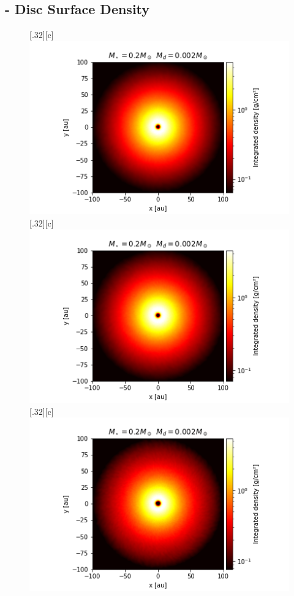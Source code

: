 \documentclass[aps,prb,twocolumn,superscriptaddress,floatfix,longbibliography]{revtex4-2}
\begin{document}
\begin{appendices}
\section{- Disc Surface Density}\label{app:appendixB}
\begin{figure}[!htbp]\vspace*{3cm}
  \centering
   \subcaptionbox*{}[.32\linewidth][c]{%
      \includegraphics[width=\linewidth]{Graphs_2D/r_0.2s_0.002d_0.3q_2D.png}}\quad
      \vspace{-2\baselineskip}
  \subcaptionbox*{}[.32\linewidth][c]{%
    \includegraphics[width=\linewidth]{Graphs_2D/r_0.2s_0.002d_0.5q_2D.png}}\quad
  \subcaptionbox*{}[.32\linewidth][c]{%
    \includegraphics[width=\linewidth]{Graphs_2D/r_0.2s_0.002d_0.7q_2D.png}}\quad

\end{figure}
\end{appendices}
\end{document}
